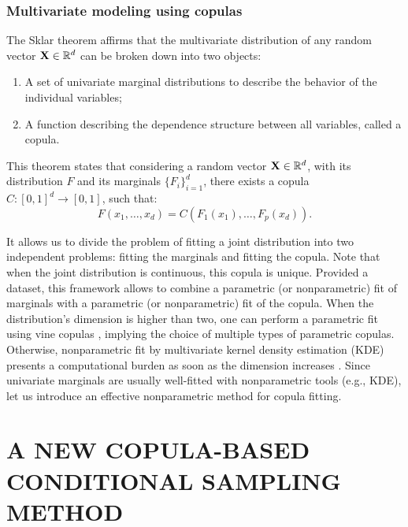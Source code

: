\subsubsection{Multivariate modeling using copulas}
The  Sklar theorem \citep{joe_1997} affirms that the multivariate distribution of any random vector $\mathbf{X} \in \mathbb{R}^d$ can be broken down into two objects:
\begin{enumerate}
    \item A set of univariate marginal distributions to describe the behavior of the individual variables;
    \item A function describing the dependence structure between all variables, called a copula. 
\end{enumerate}
This theorem states that considering a random vector $\mathbf{X} \in \mathbb{R}^d$, with its distribution $F$ and its marginals $\{F_i\}_{i=1}^d$, there exists a copula $C: [0, 1]^d \rightarrow [0, 1]$, such that:
\begin{equation}
    F(x_1, \dots, x_d) = C\left(F_1(x_1), \dots, F_p(x_d)\right). 
\end{equation}

It allows us to divide the problem of fitting a joint distribution into two independent problems: fitting the marginals and fitting the copula. 
Note that when the joint distribution is continuous, this copula is unique. 
Provided a dataset, this framework allows to combine a parametric (or nonparametric) fit of marginals with a parametric (or nonparametric) fit of the copula. 
When the distribution's dimension is higher than two, one can perform a parametric fit using vine copulas \citep{joe2011dependence}, implying the choice of multiple types of parametric copulas. 
Otherwise, nonparametric fit by multivariate kernel density estimation (KDE) presents a computational burden as soon as the dimension increases \citep{chabridon2021global}. 
Since univariate marginals are usually well-fitted with nonparametric tools (e.g., KDE), let us introduce an effective nonparametric method for copula fitting.


\section{A NEW COPULA-BASED CONDITIONAL SAMPLING METHOD}

